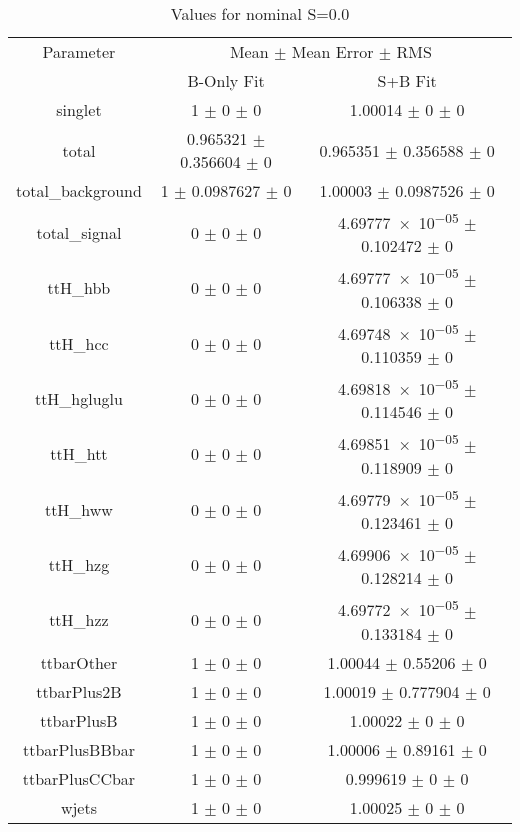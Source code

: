 \begin{table}
\centering
\caption{Values for nominal S=0.0}
\begin{tabular}{ccc}
\toprule
Parameter & \multicolumn{2}{c}{Mean $\pm$ Mean Error $\pm$ RMS}\\
 & B-Only Fit & S+B Fit\\
\midrule
singlet & \num{1} $\pm$ \num{0} $\pm$ \num{0} & \num{1.00014} $\pm$ \num{0} $\pm$ \num{0}\\
total & \num{0.965321} $\pm$ \num{0.356604} $\pm$ \num{0} & \num{0.965351} $\pm$ \num{0.356588} $\pm$ \num{0}\\
total\_background & \num{1} $\pm$ \num{0.0987627} $\pm$ \num{0} & \num{1.00003} $\pm$ \num{0.0987526} $\pm$ \num{0}\\
total\_signal & \num{0} $\pm$ \num{0} $\pm$ \num{0} & \num{4.69777e-05} $\pm$ \num{0.102472} $\pm$ \num{0}\\
ttH\_hbb & \num{0} $\pm$ \num{0} $\pm$ \num{0} & \num{4.69777e-05} $\pm$ \num{0.106338} $\pm$ \num{0}\\
ttH\_hcc & \num{0} $\pm$ \num{0} $\pm$ \num{0} & \num{4.69748e-05} $\pm$ \num{0.110359} $\pm$ \num{0}\\
ttH\_hgluglu & \num{0} $\pm$ \num{0} $\pm$ \num{0} & \num{4.69818e-05} $\pm$ \num{0.114546} $\pm$ \num{0}\\
ttH\_htt & \num{0} $\pm$ \num{0} $\pm$ \num{0} & \num{4.69851e-05} $\pm$ \num{0.118909} $\pm$ \num{0}\\
ttH\_hww & \num{0} $\pm$ \num{0} $\pm$ \num{0} & \num{4.69779e-05} $\pm$ \num{0.123461} $\pm$ \num{0}\\
ttH\_hzg & \num{0} $\pm$ \num{0} $\pm$ \num{0} & \num{4.69906e-05} $\pm$ \num{0.128214} $\pm$ \num{0}\\
ttH\_hzz & \num{0} $\pm$ \num{0} $\pm$ \num{0} & \num{4.69772e-05} $\pm$ \num{0.133184} $\pm$ \num{0}\\
ttbarOther & \num{1} $\pm$ \num{0} $\pm$ \num{0} & \num{1.00044} $\pm$ \num{0.55206} $\pm$ \num{0}\\
ttbarPlus2B & \num{1} $\pm$ \num{0} $\pm$ \num{0} & \num{1.00019} $\pm$ \num{0.777904} $\pm$ \num{0}\\
ttbarPlusB & \num{1} $\pm$ \num{0} $\pm$ \num{0} & \num{1.00022} $\pm$ \num{0} $\pm$ \num{0}\\
ttbarPlusBBbar & \num{1} $\pm$ \num{0} $\pm$ \num{0} & \num{1.00006} $\pm$ \num{0.89161} $\pm$ \num{0}\\
ttbarPlusCCbar & \num{1} $\pm$ \num{0} $\pm$ \num{0} & \num{0.999619} $\pm$ \num{0} $\pm$ \num{0}\\
wjets & \num{1} $\pm$ \num{0} $\pm$ \num{0} & \num{1.00025} $\pm$ \num{0} $\pm$ \num{0}\\
\bottomrule
\end{tabular}
\end{table}